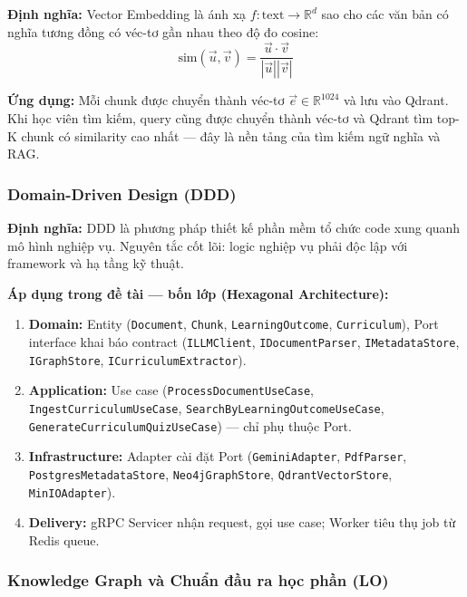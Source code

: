 \textbf{Định nghĩa:} Vector Embedding là ánh xạ $f: \text{text} \to
\mathbb{R}^d$ sao cho các văn bản có nghĩa tương đồng có véc-tơ gần nhau
theo độ đo cosine:
\[
    \text{sim}(\vec{u}, \vec{v}) = \frac{\vec{u} \cdot \vec{v}}{|\vec{u}||\vec{v}|}
\]

\textbf{Ứng dụng:} Mỗi chunk được chuyển thành véc-tơ $\vec{e} \in
\mathbb{R}^{1024}$ và lưu vào Qdrant. Khi học viên tìm kiếm, query cũng được
chuyển thành véc-tơ và Qdrant tìm top-K chunk có similarity cao nhất --- đây
là nền tảng của tìm kiếm ngữ nghĩa và RAG.

\subsubsection{Domain-Driven Design (DDD)}

\textbf{Định nghĩa:} DDD \cite{evans2004ddd} là phương pháp thiết kế phần
mềm tổ chức code xung quanh mô hình nghiệp vụ. Nguyên tắc cốt lõi:
logic nghiệp vụ phải độc lập với framework và hạ tầng kỹ thuật.

\textbf{Áp dụng trong đề tài --- bốn lớp (Hexagonal Architecture):}
\begin{enumerate}
    \item \textbf{Domain:} Entity (\texttt{Document}, \texttt{Chunk},
          \texttt{LearningOutcome}, \texttt{Curriculum}), Port interface khai
          báo contract (\texttt{ILLMClient}, \texttt{IDocumentParser},
          \texttt{IMetadataStore}, \texttt{IGraphStore}, \texttt{ICurriculumExtractor}).
    \item \textbf{Application:} Use case (\texttt{ProcessDocumentUseCase},
          \texttt{IngestCurriculumUseCase}, \texttt{SearchByLearningOutcomeUseCase},
          \texttt{GenerateCurriculumQuizUseCase}) --- chỉ phụ thuộc Port.
    \item \textbf{Infrastructure:} Adapter cài đặt Port (\texttt{GeminiAdapter},
          \texttt{PdfParser}, \texttt{PostgresMetadataStore},
          \texttt{Neo4jGraphStore}, \texttt{QdrantVectorStore}, \texttt{MinIOAdapter}).
    \item \textbf{Delivery:} gRPC Servicer nhận request, gọi use case; Worker
          tiêu thụ job từ Redis queue.
\end{enumerate}

\subsubsection{Knowledge Graph và Chuẩn đầu ra học phần (LO)}

